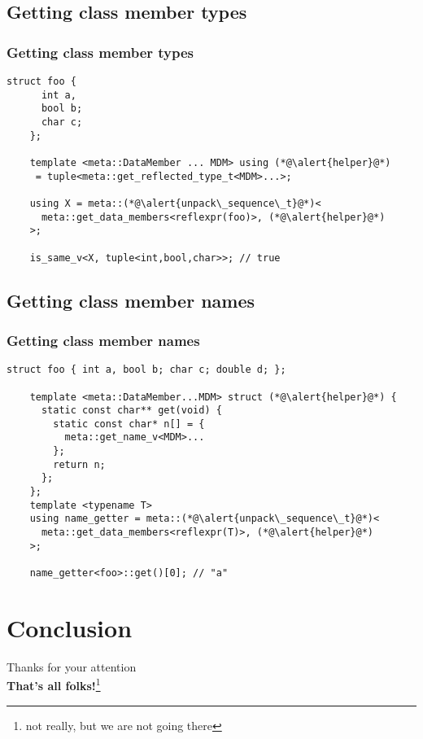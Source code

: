 \documentclass[compress,table,xcolor=table]{beamer}
\begin{document}
\subsection{Getting class member types}
\begin{frame}[fragile]
\frametitle{Getting class member types}
\begin{lstlisting}[basicstyle=\small\ttfamily]
	struct foo {
	  int a,
	  bool b;
	  char c;
	};

	template <meta::DataMember ... MDM> using (*@\alert{helper}@*)
	 = tuple<meta::get_reflected_type_t<MDM>...>;

	using X = meta::(*@\alert{unpack\_sequence\_t}@*)<
	  meta::get_data_members<reflexpr(foo)>, (*@\alert{helper}@*)
	>;

	is_same_v<X, tuple<int,bool,char>>; // true
\end{lstlisting}
\end{frame}

\subsection{Getting class member names}
\begin{frame}[fragile]
\frametitle{Getting class member names}
\begin{lstlisting}[basicstyle=\small\ttfamily]
	struct foo { int a, bool b; char c; double d; };

	template <meta::DataMember...MDM> struct (*@\alert{helper}@*) {
	  static const char** get(void) {
	    static const char* n[] = {
	      meta::get_name_v<MDM>...
	    };
	    return n;
	  };
	};
	template <typename T>
	using name_getter = meta::(*@\alert{unpack\_sequence\_t}@*)<
	  meta::get_data_members<reflexpr(T)>, (*@\alert{helper}@*)
	>;

	name_getter<foo>::get()[0]; // "a"
\end{lstlisting}
\end{frame}

\section{Conclusion}

\begin{frame}
\begin{center}
\Huge
Thanks for your attention\\
\textbf{That's all folks!}\footnote{not really, but we are not going there}
\end{center}
\end{frame}
\end{document}
